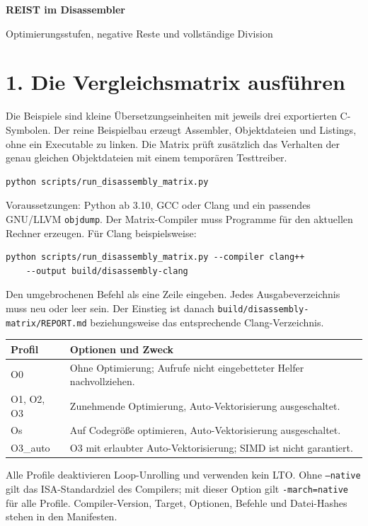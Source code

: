 \documentclass[11pt,a4paper]{article}
\begin{document}
{\color{accent}\LARGE\bfseries REIST im Disassembler}\par
{\large Optimierungsstufen, negative Reste und vollständige Division}

\section*{1. Die Vergleichsmatrix ausführen}
Die Beispiele sind kleine Übersetzungseinheiten mit jeweils drei exportierten
C-Symbolen. Der reine Beispielbau erzeugt Assembler, Objektdateien und Listings,
ohne ein Executable zu linken. Die Matrix prüft zusätzlich das Verhalten der
genau gleichen Objektdateien mit einem temporären Testtreiber.

\begin{lstlisting}
python scripts/run_disassembly_matrix.py
\end{lstlisting}
Voraussetzungen: Python ab 3.10, GCC oder Clang und ein passendes GNU/LLVM
\texttt{objdump}. Der Matrix-Compiler muss Programme für den aktuellen Rechner
erzeugen. Für Clang beispielsweise:
\begin{lstlisting}
python scripts/run_disassembly_matrix.py --compiler clang++
    --output build/disassembly-clang
\end{lstlisting}
Den umgebrochenen Befehl als eine Zeile eingeben. Jedes Ausgabeverzeichnis muss
neu oder leer sein. Der Einstieg ist danach
\texttt{build/disassembly-matrix/REPORT.md} beziehungsweise das entsprechende
Clang-Verzeichnis.

\begin{tabularx}{\linewidth}{@{}lX@{}}
\toprule
Profil & Optionen und Zweck \\
\midrule
O0 & Ohne Optimierung; Aufrufe nicht eingebetteter Helfer nachvollziehen. \\
O1, O2, O3 & Zunehmende Optimierung, Auto-Vektorisierung ausgeschaltet. \\
Os & Auf Codegröße optimieren, Auto-Vektorisierung ausgeschaltet. \\
O3\_auto & O3 mit erlaubter Auto-Vektorisierung; SIMD ist nicht garantiert. \\
\bottomrule
\end{tabularx}

Alle Profile deaktivieren Loop-Unrolling und verwenden kein LTO. Ohne
\texttt{--native} gilt das ISA-Standardziel des Compilers; mit dieser Option
gilt \texttt{-march=native} für alle Profile. Compiler-Version, Target, Optionen,
Befehle und Datei-Hashes stehen in den Manifesten.
\end{document}
